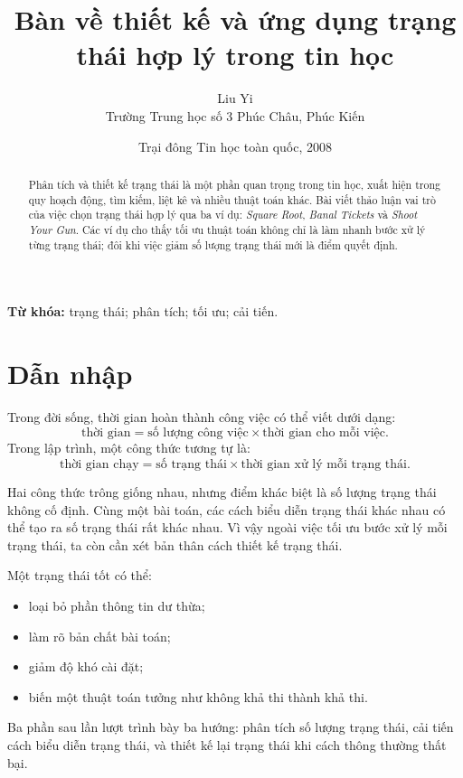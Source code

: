 \documentclass[11pt]{article}
\title{Bàn về thiết kế và ứng dụng trạng thái hợp lý trong tin học}
\author{Liu Yi\\Trường Trung học số 3 Phúc Châu, Phúc Kiến}
\date{Trại đông Tin học toàn quốc, 2008}
\begin{document}
\maketitle


\renewcommand{\abstractname}{Tóm tắt}
\begin{abstract}
Phân tích và thiết kế trạng thái là một phần quan trọng trong tin học, xuất
hiện trong quy hoạch động, tìm kiếm, liệt kê và nhiều thuật toán khác. Bài
viết thảo luận vai trò của việc chọn trạng thái hợp lý qua ba ví dụ:
\textit{Square Root}, \textit{Banal Tickets} và \textit{Shoot Your Gun}. Các
ví dụ cho thấy tối ưu thuật toán không chỉ là làm nhanh bước xử lý từng trạng
thái; đôi khi việc giảm số lượng trạng thái mới là điểm quyết định.
\end{abstract}

\noindent\textbf{Từ khóa:} trạng thái; phân tích; tối ưu; cải tiến.

\section{Dẫn nhập}

Trong đời sống, thời gian hoàn thành công việc có thể viết dưới dạng:
\[
  \text{thời gian}=\text{số lượng công việc}\times\text{thời gian cho mỗi việc}.
\]
Trong lập trình, một công thức tương tự là:
\[
  \text{thời gian chạy}
  =\text{số trạng thái}\times\text{thời gian xử lý mỗi trạng thái}.
\]

Hai công thức trông giống nhau, nhưng điểm khác biệt là số lượng trạng thái
không cố định. Cùng một bài toán, các cách biểu diễn trạng thái khác nhau có
thể tạo ra số trạng thái rất khác nhau. Vì vậy ngoài việc tối ưu bước xử lý
mỗi trạng thái, ta còn cần xét bản thân cách thiết kế trạng thái.

Một trạng thái tốt có thể:
\begin{itemize}
  \item loại bỏ phần thông tin dư thừa;
  \item làm rõ bản chất bài toán;
  \item giảm độ khó cài đặt;
  \item biến một thuật toán tưởng như không khả thi thành khả thi.
\end{itemize}

Ba phần sau lần lượt trình bày ba hướng: phân tích số lượng trạng thái, cải
tiến cách biểu diễn trạng thái, và thiết kế lại trạng thái khi cách thông
thường thất bại.
\end{document}
